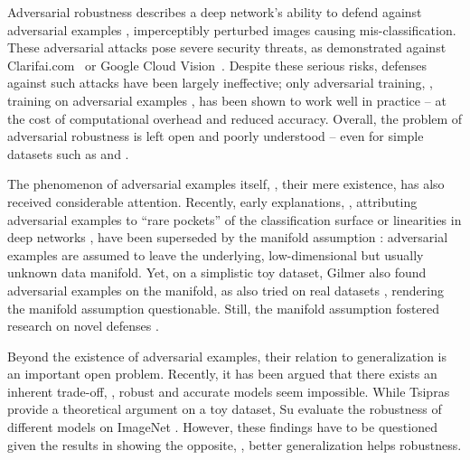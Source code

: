 Adversarial robustness describes a deep network's ability to defend against adversarial examples \cite{SzegedyARXIV2013}, imperceptibly perturbed images causing mis-classification. These adversarial attacks pose severe security threats, as demonstrated against Clarifai.com~\cite{LiuICLR2017,BhagojiARXIV2017b} or Google Cloud Vision~\cite{IlyasICML2018}. Despite these serious risks, defenses against such attacks have been largely ineffective; only adversarial training, \ie, training on adversarial examples \cite{MadryICLR2018,GoodfellowARXIV2014}, has been shown to work well in practice \cite{AthalyeARXIV2018,AthalyeARXIV2018b} -- at the cost of computational overhead and reduced accuracy. Overall, the problem of adversarial robustness is left open and poorly understood -- even for simple datasets such as \MNIST \cite{CohenARXIV2017} and \FashionMNIST \cite{XiaoARXIV2017}.

The phenomenon of adversarial examples itself, \ie, their mere existence, has also received considerable attention. Recently, early explanations, \eg, attributing adversarial examples to ``rare pockets'' of the classification surface \cite{SzegedyARXIV2013} or linearities in deep networks \cite{GoodfellowARXIV2014}, have been superseded by the manifold assumption \cite{GilmerICLRWORK2018,TanayARXIV2016}: adversarial examples are assumed to leave the underlying, low-dimensional but usually unknown data manifold.  Yet, on a simplistic toy dataset, Gilmer \etal \cite{GilmerICLRWORK2018} also found adversarial examples on the manifold, as also tried on real datasets \cite{SongARXIV2018,BrownARXIV2018,ZhaoICLR2018}, rendering the manifold assumption questionable. Still, the manifold assumption fostered research on novel defenses \cite{IlyasARXIV2017,SamangoueiICLR2018,SchottARXIV2018}.

Beyond the existence of adversarial examples, their relation to generalization is an important open problem. Recently, it has been argued \cite{TsiprasARXIV2018,SuARXV2018} that there exists an inherent trade-off, \ie, robust and accurate models seem impossible. While Tsipras \etal \cite{TsiprasARXIV2018} provide a theoretical argument on a toy dataset, Su \etal \cite{SuARXV2018} evaluate the robustness of different models on ImageNet \cite{RussakovskyIJCV2015}. However, these findings have to be questioned  given the results in \cite{GilmerICLRWORK2018,RozsaICMLA2016} showing the opposite, \ie, better generalization helps robustness.

